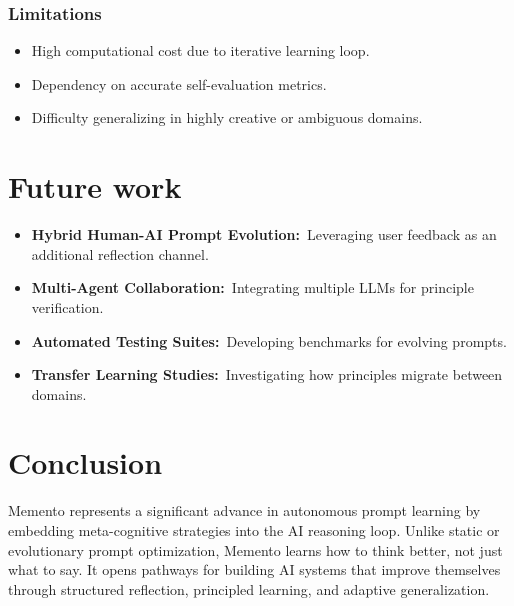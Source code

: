 \documentclass[10pt,a4paper,twocolumn]{article}
\begin{document}
\subsubsection{Limitations}


\begin{itemize}
    \item High computational cost due to iterative learning loop.
    \item Dependency on accurate self-evaluation metrics.
    \item Difficulty generalizing in highly creative or ambiguous domains.

\end{itemize}






\section{{Future work} }







\begin{itemize}
    \item \textbf{Hybrid Human-AI Prompt Evolution:} Leveraging user feedback as an additional reflection channel.
    \item \textbf{Multi-Agent Collaboration:} Integrating multiple LLMs for principle verification.
    \item \textbf{Automated Testing Suites:} Developing benchmarks for evolving prompts.
    \item \textbf{Transfer Learning Studies:} Investigating how principles migrate between domains.
\end{itemize}




\section{{Conclusion} }




 Memento represents a significant advance in autonomous prompt learning by embedding meta-cognitive strategies into the AI reasoning loop. Unlike static or evolutionary prompt optimization, Memento learns how to think better, not just what to say. It opens pathways for building AI systems that improve themselves through structured reflection, principled learning, and adaptive generalization.
\end{document}
